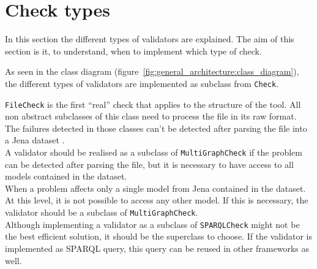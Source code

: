 \documentclass[11pt,a4paper]{article}
\newcommand{\class}[1]{\texttt{#1}}
\begin{document}
\section{Check types}
\label{sec:check_types}
%
In this section the different types of validators are explained. 
The aim of this section is it, to understand, when to implement which type of check. 

As seen in the class diagram (figure~\ref{fig:general_architecture:class_diagram}), the different types of validators are implemented as subclass from \class{Check}. 

\class{FileCheck} is the first \enquote{real} check that applies to the structure of the tool. 
All non abstract subclasses of this class need to process the file in its raw format. 
The failures detected in those classes can't be detected after parsing the file into a Jena dataset \cite{apache_jena}. 
\\
A validator should be realised as a subclass of \class{MultiGraphCheck} if the problem can be detected after parsing the file, but it is necessary to have access to all models contained in the dataset. 
\\
When a problem affects only a single model from Jena contained in the dataset. 
At this level, it is not possible to access any other model. 
If this is necessary, the validator should be a subclass of \class{MultiGraphCheck}. 
\\
Although implementing a validator as a subclass of \class{SPARQLCheck} might not be the best efficient solution, it should be the superclass to choose. 
If the validator is implemented as SPARQL query, this query can be reused in other frameworks as well. 
 
\end{document}
